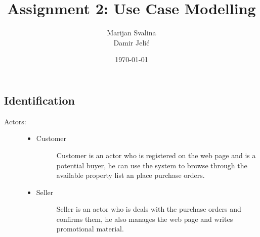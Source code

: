 \documentclass[12pt, titlepage, a4paper]{article}
\title{Assignment 2: Use Case Modelling}
\date{\today}
\author{Marijan Svalina \\ Damir Jelić}
\begin{document}
\maketitle 

\setcounter{section}{2}
\subsection{Identification}

\begin{description}
    \item[Actors:] \hfil
    \begin{itemize}
    \item
        Customer
        \begin{description}
            \item[]Customer is an actor who is registered on the web page and is a potential buyer, 
            he can use the system to browse through the available 
            property list an place purchase orders. 
        \end{description}
    \item
        Seller
        \begin{description}
            \item[]Seller is an actor who is deals with the purchase orders and confirms them,
		    he also manages the web page and writes promotional material.
        \end{description}
    \end{itemize}


\end{description}
\end{document}
